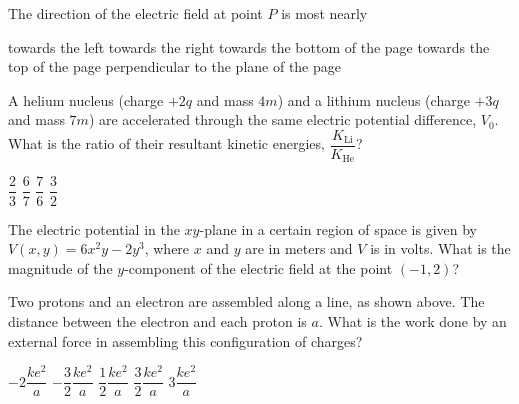 \documentclass[12pt]{../../oss-apphys-exam}
\begin{document}
\begin{questions}
  \question The direction of the electric field at point $P$ is most nearly
  \label{contour2}
  \begin{choices}
    \choice towards the left
    \choice towards the right
    \choice towards the bottom of the page
    \choice towards the top of the page
    \choice perpendicular to the plane of the page
  \end{choices}
  \newpage
  
  \question A helium nucleus (charge $+2q$ and mass $4m$) and a lithium nucleus
  (charge $+3q$ and mass $7m$) are accelerated through the same electric
  potential difference, $V_0$. What is the ratio of their resultant
  kinetic energies, $\dfrac{K_\text{Li}}{K_\text{He}}$?
  \begin{choices}
    \choice$\dfrac23$
    \choice$\dfrac67$
    \choice$\dfrac76$
    \choice$\dfrac32$
  \end{choices}
  \newpage
  
  \question The electric potential in the $xy$-plane in a certain region of
  space is given by $V(x,y)=6x^2y-2y^3$, where $x$ and $y$ are in meters and
  $V$ is in volts. What is the magnitude of the $y$-component of the electric
  field at the point $(-1,2)$?
  \newpage
  

  \question Two protons and an electron are assembled along a line, as shown
  above. The distance between the electron and each proton is $a$. What is the
  work done by an external force in assembling this configuration of charges?
  \begin{choices}
    \choice $-2\dfrac{ke^2}a$
    \choice $-\dfrac32\dfrac{ke^2}a$
    \choice $\dfrac12\dfrac{ke^2}a$
    \choice $\dfrac32\dfrac{ke^2}a$
    \choice $3\dfrac{ke^2}a$
  \end{choices}
  \newpage
  

\end{questions}
\end{document}
